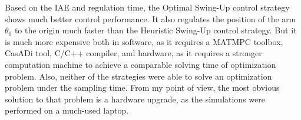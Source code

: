 Based on the IAE and regulation time, the  Optimal Swing-Up control strategy shows much better control performance. It also regulates the position of the arm $\theta_0$ to the origin much faster than the Heuristic Swing-Up control strategy. But it is much more expensive both in software, as it requires a \textsc{MATMPC} toolbox, CasADi tool, C/C++ compiler, and hardware, as it requires a stronger computation machine to achieve a comparable solving time of optimization problem. Also, neither of the strategies were able to solve an optimization problem under the sampling time. From my point of view, the most obvious solution to that problem is a hardware upgrade, as the simulations were performed on a much-used laptop.